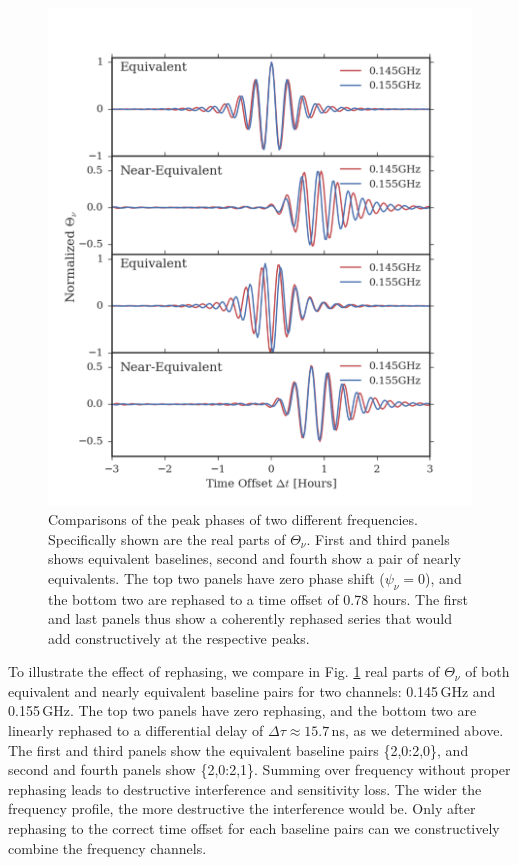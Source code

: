 \documentclass[twocolumn,apj,numberedappendix]{emulateapj}
\renewcommand\[{\begin{equation}}
\renewcommand\]{\end{equation}}
\begin{document}
\begin{figure}[t]
\includegraphics[width=1.1\linewidth]{rephs_rb}

\caption{Comparisons of the peak phases of two different frequencies. Specifically shown are the real parts of $\Theta_{\nu}$. First and third panels shows equivalent baselines, second and fourth show a pair of nearly equivalents. The top two panels have zero phase shift ($\psi_{\nu}=0$), and the bottom two are rephased to a time offset of 0.78 hours. The first and last panels thus show a coherently rephased series that would add constructively at the respective peaks. }
\label{fig:freqdiff}
\end{figure}

To illustrate the effect of rephasing, we compare in Fig. \ref{fig:freqdiff} real parts of $\Theta_{\nu}$ of both equivalent and nearly equivalent baseline pairs for two channels: 0.145\,GHz and 0.155\,GHz. The top two panels have zero rephasing, and the bottom two are linearly rephased to a differential delay of $\Delta\tau\approx15.7$\,ns, as we determined above. The first and third panels show the equivalent baseline pairs \{2,0:2,0\}, and second and fourth panels show \{2,0:2,1\}. Summing over frequency without proper rephasing leads to destructive interference and sensitivity loss. The wider the frequency profile, the more destructive the interference would be. Only after rephasing to the correct time offset for each baseline pairs can we constructively combine the frequency channels. 
\end{document}
